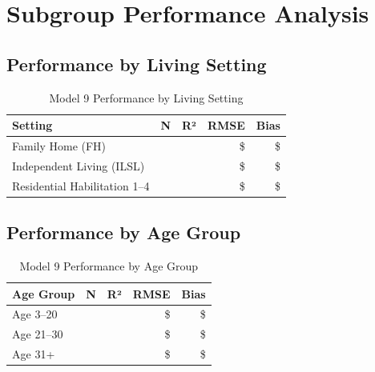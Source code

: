 \section{Subgroup Performance Analysis}

\subsection{Performance by Living Setting}

\begin{table}[h]
\centering
\caption{Model 9 Performance by Living Setting}
\begin{tabular}{lrrrr}
\toprule
\textbf{Setting} & \textbf{N} & \textbf{R²} & \textbf{RMSE} & \textbf{Bias} \\
\midrule
Family Home (FH) & \ModelNineSubgrouplivingFHN{} & \ModelNineSubgrouplivingFHRSquared{} & \$\ModelNineSubgrouplivingFHRMSE{} & \$\ModelNineSubgrouplivingFHBias{} \\
Independent Living (ILSL) & \ModelNineSubgrouplivingILSLN{} & \ModelNineSubgrouplivingILSLRSquared{} & \$\ModelNineSubgrouplivingILSLRMSE{} & \$\ModelNineSubgrouplivingILSLBias{} \\
Residential Habilitation 1--4 & \ModelNineSubgrouplivingRHOneToFourN{} & \ModelNineSubgrouplivingRHOneToFourRSquared{} & \$\ModelNineSubgrouplivingRHOneToFourRMSE{} & \$\ModelNineSubgrouplivingRHOneToFourBias{} \\
\bottomrule
\end{tabular}
\label{tab:model9_by_living}
\end{table}

\subsection{Performance by Age Group}

\begin{table}[h]
\centering
\caption{Model 9 Performance by Age Group}
\begin{tabular}{lrrrr}
\toprule
\textbf{Age Group} & \textbf{N} & \textbf{R²} & \textbf{RMSE} & \textbf{Bias} \\
\midrule
Age 3--20 & \ModelNineSubgroupageAgeUnderTwentyOneN{} & \ModelNineSubgroupageAgeUnderTwentyOneRSquared{} & \$\ModelNineSubgroupageAgeUnderTwentyOneRMSE{} & \$\ModelNineSubgroupageAgeUnderTwentyOneBias{} \\
Age 21--30 & \ModelNineSubgroupageAgeTwentyOneToThirtyN{} & \ModelNineSubgroupageAgeTwentyOneToThirtyRSquared{} & \$\ModelNineSubgroupageAgeTwentyOneToThirtyRMSE{} & \$\ModelNineSubgroupageAgeTwentyOneToThirtyBias{} \\
Age 31+ & \ModelNineSubgroupageAgeThirtyOnePlusN{} & \ModelNineSubgroupageAgeThirtyOnePlusRSquared{} & \$\ModelNineSubgroupageAgeThirtyOnePlusRMSE{} & \$\ModelNineSubgroupageAgeThirtyOnePlusBias{} \\
\bottomrule
\end{tabular}
\label{tab:model9_by_age}
\end{table}

